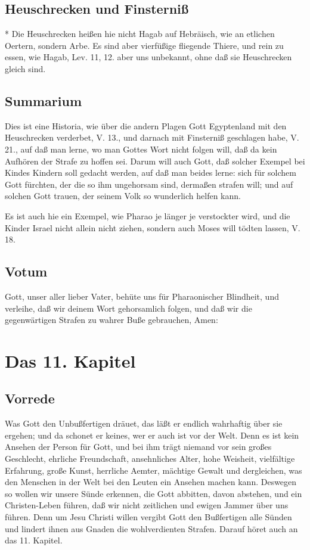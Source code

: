 \section{Heuschrecken und Finsterniß}
* Die Heuschrecken heißen hie nicht Hagab auf Hebräisch, wie an etlichen Oertern, sondern Arbe. Es sind aber vierfüßige fliegende Thiere, und rein zu essen, wie Hagab, Lev. 11, 12. aber uns unbekannt, ohne daß sie Heuschrecken gleich sind.

\section{Summarium}

Dies ist eine Historia, wie über die andern Plagen Gott Egyptenland mit den Heuschrecken verderbet, V. 13., und darnach mit Finsterniß geschlagen habe, V. 21., auf daß man lerne, wo man Gottes Wort nicht folgen will, daß da kein Aufhören der Strafe zu hoffen sei. Darum will auch Gott, daß solcher Exempel bei Kindes Kindern soll gedacht werden, auf daß man beides lerne: sich für solchem Gott fürchten, der die so ihm ungehorsam sind, dermaßen strafen will; und auf solchen Gott trauen, der seinem Volk so wunderlich helfen kann.

Es ist auch hie ein Exempel, wie Pharao je länger je verstockter wird, und die Kinder Israel nicht allein nicht ziehen, sondern auch Moses will tödten lassen, V. 18.

\section{Votum}

Gott, unser aller lieber Vater, behüte uns für Pharaonischer Blindheit, und verleihe, daß wir deinem Wort gehorsamlich folgen, und daß wir die gegenwärtigen Strafen zu wahrer Buße gebrauchen, Amen:

\chapter{Das 11. Kapitel}

\section{Vorrede}

Was Gott den Unbußfertigen dräuet, das läßt er endlich wahrhaftig über sie ergehen; und da schonet er keines, wer er auch ist vor der Welt. Denn es ist kein Ansehen der Person für Gott, und bei ihm trägt niemand vor sein großes Geschlecht, ehrliche Freundschaft, ansehnliches Alter, hohe Weisheit, vielfältige Erfahrung, große Kunst, herrliche Aemter, mächtige Gewalt und dergleichen, was den Menschen in der Welt bei den Leuten ein Ansehen machen kann. Deswegen so wollen wir unsere Sünde erkennen, die Gott abbitten, davon abstehen, und ein Christen-Leben führen, daß wir nicht zeitlichen und ewigen Jammer über uns führen. Denn um Jesu Christi willen vergibt Gott den Bußfertigen alle Sünden und lindert ihnen aus Gnaden die wohlverdienten Strafen. Darauf höret auch an das 11. Kapitel.

